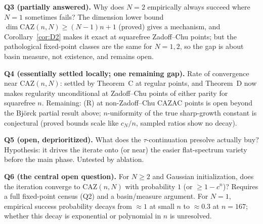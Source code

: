 \documentclass[11pt]{article}
\theoremstyle{plain}
\theoremstyle{definition}
\theoremstyle{remark}
\newcommand{\CAZ}{\mathrm{CAZ}}
\begin{document}
\noindent\textbf{Q3 (partially answered).} Why does $N=2$ empirically always
succeed where $N=1$ sometimes fails? The dimension lower bound
$\dim\CAZ(n,N)\ge(N-1)n+1$ (proved) gives a mechanism, and
Corollary~\ref{cor:D2} makes it exact at squarefree Zadoff--Chu points; but
the pathological fixed-point classes are the same for $N=1,2$, so the gap
is about basin measure, not existence, and remains open.

\noindent\textbf{Q4 (essentially settled locally; one remaining gap).} Rate of
convergence near $\CAZ(n,N)$: settled by Theorem~C at regular points, and
Theorem~D now makes regularity unconditional at Zadoff--Chu points of
either parity for squarefree $n$. Remaining: (R) at non-Zadoff--Chu CAZAC
points is open beyond the Bj\"orck partial result above; $n$-uniformity of
the true sharp-growth constant is conjectural (proved bounds scale like
$c_N/n$, sampled ratios show no decay).

\noindent\textbf{Q5 (open, deprioritized).} What does the $\tau$-continuation
presolve actually buy? Hypothesis: it drives the iterate onto (or near) the
easier flat-spectrum variety before the main phase. Untested by ablation.

\noindent\textbf{Q6 (the central open question).} For $N\ge2$ and Gaussian
initialization, does the iteration converge to $\CAZ(n,N)$ with
probability $1$ (or $\ge1-c^n$)? Requires a full fixed-point census (Q2)
and a basin/measure argument. For $N=1$, empirical success probability
decays from $\approx1$ at small $n$ to $\approx0.3$ at $n=167$; whether
this decay is exponential or polynomial in $n$ is unresolved.
\end{document}

